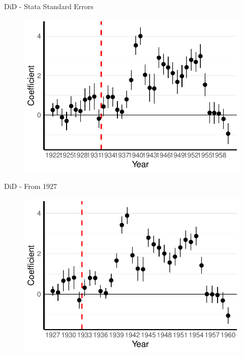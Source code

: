 \documentclass[11pt]{beamer}
\begin{document}
\begin{frame}[label=did_stata_se]{DiD - Stata Standard Errors}
 \begin{figure}[h]
\centering
\includegraphics[width=1\textwidth]{fmla_pred_full_imp_date_no_trends_geopol_stata_SE.pdf}
\end{figure}
\hyperlink{robustness_checks}{}
\end{frame}

\begin{frame}[label=did_from_1927]{DiD - From 1927}
 \begin{figure}[h]
\centering
\includegraphics[width=1\textwidth]{pred_full_imp_date_no_trends_geopol_cr2_base_1927.pdf}
\end{figure}
\hyperlink{robustness_checks}{}
\end{frame}
\end{document}

